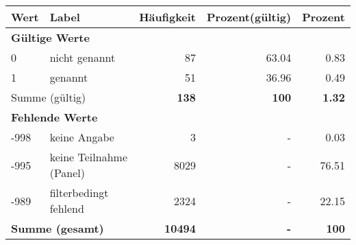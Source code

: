      \begin{longtable}{lXrrr}
     \toprule
     \textbf{Wert} & \textbf{Label} & \textbf{Häufigkeit} & \textbf{Prozent(gültig)} & \textbf{Prozent} \\
     \endhead
     \midrule
     \multicolumn{5}{l}{\textbf{Gültige Werte}}\\

     0 &
     \multicolumn{1}{X}{ nicht genannt   } &


       \num{87} &
       \num[round-mode=places,round-precision=2]{63.04} &
         \num[round-mode=places,round-precision=2]{0.83} \\

     1 &
     \multicolumn{1}{X}{ genannt   } &


       \num{51} &
       \num[round-mode=places,round-precision=2]{36.96} &
         \num[round-mode=places,round-precision=2]{0.49} \\
     \midrule
     \multicolumn{2}{l}{Summe (gültig)} &
       \textbf{\num{138}} &
     \textbf{\num{100}} &
       \textbf{\num[round-mode=places,round-precision=2]{1.32}} \\
     \multicolumn{5}{l}{\textbf{Fehlende Werte}}\\
       -998 &
       keine Angabe &
         \num{3} &
        - &
         \num[round-mode=places,round-precision=2]{0.03} \\
       -995 &
       keine Teilnahme (Panel) &
         \num{8029} &
        - &
         \num[round-mode=places,round-precision=2]{76.51} \\
       -989 &
       filterbedingt fehlend &
         \num{2324} &
        - &
         \num[round-mode=places,round-precision=2]{22.15} \\
     \midrule
     \multicolumn{2}{l}{\textbf{Summe (gesamt)}} &
          \textbf{\num{10494}} &
        \textbf{-} &
        \textbf{\num{100}} \\
     \bottomrule
     \end{longtable}
     
